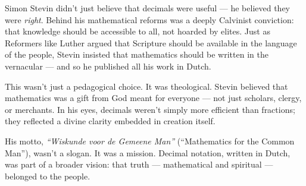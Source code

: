 \begin{tcolorbox}[colback=gray!5!white, colframe=black!80!white, title={Historical Sidenote: Stevin’s Theology of Decimal Math}, fonttitle=\bfseries, arc=1.5mm, boxrule=0.4pt]

    Simon Stevin didn’t just believe that decimals were useful — he believed they were \textit{right}. Behind his mathematical reforms was a deeply Calvinist conviction: that knowledge should be accessible to all, not hoarded by elites. Just as Reformers like Luther argued that Scripture should be available in the language of the people, Stevin insisted that mathematics should be written in the vernacular — and so he published all his work in Dutch.
    
    This wasn’t just a pedagogical choice. It was theological. Stevin believed that mathematics was a gift from God meant for everyone — not just scholars, clergy, or merchants. In his eyes, decimals weren’t simply more efficient than fractions; they reflected a divine clarity embedded in creation itself.
    
    His motto, \textit{“Wiskunde voor de Gemeene Man”} (“Mathematics for the Common Man”), wasn’t a slogan. It was a mission. Decimal notation, written in Dutch, was part of a broader vision: that truth — mathematical and spiritual — belonged to the people.
    
\end{tcolorbox}

